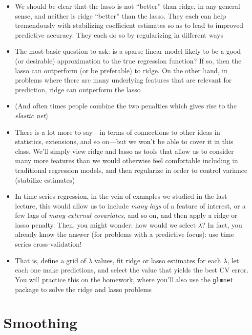 \documentclass{article}
\begin{document}
\begin{itemize}
\item We should be clear that the lasso is not ``better'' than ridge, in any
  general sense, and neither is ridge ``better'' than the lasso. They each can
  help tremendously with stabilizing coefficient estimates so as to lead to
  improved predictive accuracy. They each do so by regularizing in different
  ways 

\item The most basic question to ask: is a sparse linear model likely
  to be a good (or desirable) approximation to the true regression function? If
  so, then the lasso can outperform (or be preferable) to ridge. On the other 
  hand, in problems where there are many underlying features that are relevant
  for prediction, ridge can outperform the lasso 

\item (And often times people combine the two penalties which gives rise to the
  \emph{elastic net}) 

\item There is a lot more to say---in terms of connections to other ideas in
  statistics, extensions, and so on---but we won't be able to cover it in this
  class. We'll simply view ridge and lasso as tools that allow us to consider 
  many more features than we would otherwise feel comfortable including in
  traditional regression models, and then regularize in order to control
  variance (stabilize estimates)   

\item In time series regression, in the vein of examples we studied in the last 
  lecture, this would allow us to include \emph{many lags} of a feature of
  interest, or a few lags of \emph{many external covariates}, and so on, and
  then apply a ridge or lasso penalty. Then, you might wonder: how would we
  select $\lambda$? In fact, you already know the answer (for problems with a
  predictive focus): use time series cross-validation!

\item That is, define a grid of $\lambda$ values, fit ridge or lasso estimates
  for each $\lambda$, let each one make predictions, and select the value that 
  yields the best CV error. You will practice this on the homework, where you'll
  also use the \verb|glmnet| package to solve the ridge and lasso problems 
\end{itemize}

\section{Smoothing}
\end{document}
